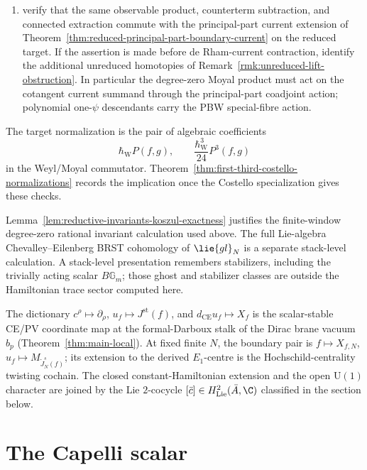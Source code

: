 \documentclass[11pt]{memoir}
\begin{document}
\begin{prob}
\begin{enumerate}
	    \item verify that the same observable product, counterterm subtraction,
	      and connected extraction commute with the principal-part current
	      extension of
	      Theorem~\ref{thm:reduced-principal-part-boundary-current} on the
	      reduced target. If the assertion is made before de Rham-current
	      contraction, identify the additional unreduced homotopies of
	      Remark~\ref{rmk:unreduced-lift-obstruction}. In particular the degree-zero
	      Moyal product must act on the cotangent current summand through the
	      principal-part coadjoint action; polynomial one-\(\psi\) descendants
	      carry the PBW special-fibre action.
	  \end{enumerate}
	  The target normalization is the pair of algebraic coefficients
  $$\hbar_{\mathrm{W}} P(f,g),\qquad \frac{\hbar_{\mathrm{W}}^3}{24}P^3(f,g)$$
  in the Weyl/Moyal commutator.
  Theorem~\ref{thm:first-third-costello-normalizations} records the
  implication once the Costello specialization gives these checks.
\end{prob}

\begin{rmk}
  Lemma~\ref{lem:reductive-invariants-koszul-exactness} justifies the
  finite-window degree-zero rational invariant calculation used above.  The full
  Lie-algebra Chevalley--Eilenberg BRST cohomology of \(\lie{gl}_N\)
  is a separate stack-level calculation.  A stack-level presentation
  remembers stabilizers, including the trivially acting scalar
  \(B\mathbb G_m\); those ghost and stabilizer classes are outside the
  Hamiltonian trace sector computed here.
\end{rmk}

The dictionary \(c^\rho\mapsto\partial_\rho\),
\(u_f\mapsto J^{\mathrm{st}}(f)\), and
\(d_{\mathrm{CE}}u_f\mapsto X_f\) is the scalar-stable CE/PV coordinate
map at the formal-Darboux stalk of the Dirac brane vacuum \(b_p\)
(Theorem~\ref{thm:main-local}).  At fixed finite \(N\), the boundary
pair is \(f\mapsto X_{f,N}\),
\(u_f\mapsto M_{\widetilde J_N^s(f)}\); its extension
to the derived \(E_1\)-centre is the Hochschild-centrality twisting
cochain.  The closed constant-Hamiltonian extension and the open
\(\mathrm{U}(1)\) character are joined by the Lie \(2\)-cocycle
\([\bar c]\in H^2_{\mathrm{Lie}}(\bar A,\C)\) classified in the
section below.

\section{The Capelli scalar}\label{sec:capelli-scalar}
\end{document}
